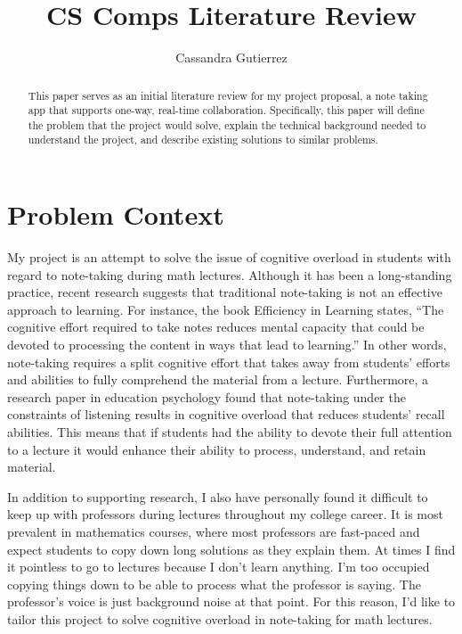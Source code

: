 \documentclass[10pt,twocolumn]{article}
\title{CS Comps Literature Review}
\author{Cassandra Gutierrez}
\affiliation{Occidental College}
\begin{document}
\maketitle

\begin{abstract}
This paper serves as an initial literature review for my project proposal, a note taking app that supports one-way, real-time collaboration. Specifically, this paper will define the problem that the project would solve, explain the technical background needed to understand the project, and describe existing solutions to similar problems.
\end{abstract}

\section{Problem Context}
My project is an attempt to solve the issue of cognitive overload in students with regard to note-taking during math lectures. Although it has been a long-standing practice, recent research suggests that traditional note-taking is not an effective approach to learning. For instance, the book Efficiency in Learning states, “The cognitive effort required to take notes reduces mental capacity that could be devoted to processing the content in ways that lead to learning.”\cite{clark_nguyen_sweller_baddeley_2006} In other words, note-taking requires a split cognitive effort that takes away from students’ efforts and abilities to fully comprehend the material from a lecture. Furthermore, a research paper in education psychology found that note-taking under the constraints of listening results in cognitive overload that reduces students’ recall abilities.\cite{rickards_fajen_sullivan_gillespie_1997} This means that if students had the ability to devote their full attention to a lecture it would enhance their ability to process, understand, and retain material. 

In addition to supporting research, I also have personally found it difficult to keep up with professors during lectures throughout my college career. It is most prevalent in mathematics courses, where most professors are fast-paced and expect students to copy down long solutions as they explain them. At times I find it pointless to go to lectures because I don’t learn anything. I’m too occupied copying things down to be able to process what the professor is saying. The professor’s voice is just background noise at that point. For this reason, I’d like to tailor this project to solve cognitive overload in note-taking for math lectures. 
\end{document}

